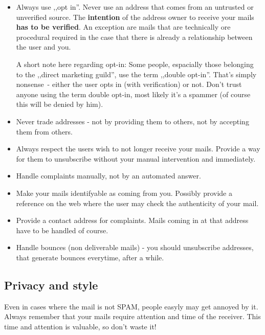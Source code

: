 \documentclass{article}
\begin{document}
\begin{itemize}
  \item Always use ,,opt in''. Never use an address that comes from an
        untrusted or unverified source. The \textbf{intention} of the
	address owner to receive your mails \textbf{has to be verified}.
	An exception
	are mails that are technically ore procedural required in the
	case that there is already a relationship between the user and
	you.

	A short note here regarding opt-in: Some people, espacially those
	belonging to the ,,direct marketing guild'', use the term ,,double
	opt-in''. That's simply nonsense~- either the user opts in (with
	verification) or not. Don't trust anyone using the term double
	opt-in, most likely it's a spammer (of course this will be denied
	by him).
  \item Never trade addresses - not by providing them to others, not by
	accepting them from others.
  \item Always respect the users wish to not longer receive your mails.
        Provide a way for them to unsubscribe without your manual
	intervention and immediately.
  \item Handle complaints manually, not by an automated answer.
  \item Make your mails identifyable as coming from you. Possibly
        provide a reference on the web where the user may check the
	authenticity of your mail.
  \item Provide a contact address for complaints. Mails coming in at
        that address have to be handled of course.
  \item Handle bounces (non deliverable mails) - you should unsubscribe
        addresses, that generate bounces everytime, after a while.
\end{itemize}

\subsection{Privacy and style}

Even in cases where the mail is not SPAM, people easyly may get annoyed by it.
Always remember that your mails require attention and time of the receiver.
This time and attention is valuable, so don't waste it!
\end{document}
